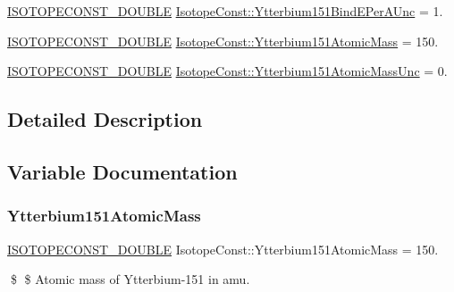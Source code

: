 \begin{DoxyCompactItemize}
\mbox{\hyperlink{group___isotope_const-_macros_ga8f45a7272ce02c0b4c65c44636ed719a}{I\+S\+O\+T\+O\+P\+E\+C\+O\+N\+S\+T\+\_\+\+D\+O\+U\+B\+LE}} \mbox{\hyperlink{group___isotope_const-_ytterbium-_yb151_gacecd8dbcead1e2fe8616304ffa976ebb}{Isotope\+Const\+::\+Ytterbium151\+Bind\+E\+Per\+A\+Unc}} = 1.
\item 
\mbox{\hyperlink{group___isotope_const-_macros_ga8f45a7272ce02c0b4c65c44636ed719a}{I\+S\+O\+T\+O\+P\+E\+C\+O\+N\+S\+T\+\_\+\+D\+O\+U\+B\+LE}} \mbox{\hyperlink{group___isotope_const-_ytterbium-_yb151_ga0c76b9d9a445ca19d6ae24a17a4df79b}{Isotope\+Const\+::\+Ytterbium151\+Atomic\+Mass}} = 150.
\item 
\mbox{\hyperlink{group___isotope_const-_macros_ga8f45a7272ce02c0b4c65c44636ed719a}{I\+S\+O\+T\+O\+P\+E\+C\+O\+N\+S\+T\+\_\+\+D\+O\+U\+B\+LE}} \mbox{\hyperlink{group___isotope_const-_ytterbium-_yb151_gae184af60c2465905c059a5fe2d3e7849}{Isotope\+Const\+::\+Ytterbium151\+Atomic\+Mass\+Unc}} = 0.
\end{DoxyCompactItemize}


\subsection{Detailed Description}


\subsection{Variable Documentation}
\mbox{\label{group___isotope_const-_ytterbium-_yb151_ga0c76b9d9a445ca19d6ae24a17a4df79b}} 
\subsubsection{\texorpdfstring{Ytterbium151\+Atomic\+Mass}{Ytterbium151AtomicMass}}
{\footnotesize\ttfamily \mbox{\hyperlink{group___isotope_const-_macros_ga8f45a7272ce02c0b4c65c44636ed719a}{I\+S\+O\+T\+O\+P\+E\+C\+O\+N\+S\+T\+\_\+\+D\+O\+U\+B\+LE}} Isotope\+Const\+::\+Ytterbium151\+Atomic\+Mass = 150.}

\$ \$ Atomic mass of Ytterbium-\/151 in amu. \mbox{\label{group___isotope_const-_ytterbium-_yb151_gae184af60c2465905c059a5fe2d3e7849}} 
